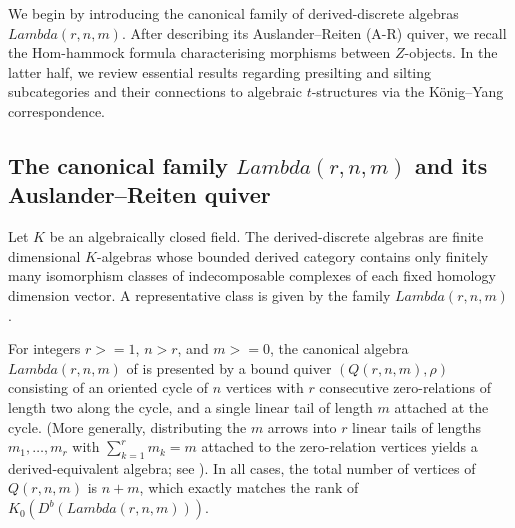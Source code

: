 \documentclass[11pt, a4paper]{article}
\theoremstyle{definition}
\def\Lambda{Lambda}%
\def\ge{>=}%
\def\mathcal#1{#1}%
\def\Db{D^b}%
\newcommand{\Db}{\mathcal{D}^b}
\begin{document}
We begin by introducing the canonical family of derived-discrete algebras $\Lambda(r,n,m)$. After describing its Auslander--Reiten (A-R) quiver, we recall the Hom-hammock formula characterising morphisms between $\mathcal{Z}$-objects. In the latter half, we review essential results regarding presilting and silting subcategories and their connections to algebraic $t$-structures via the K\"onig--Yang correspondence.

\subsection{The canonical family \texorpdfstring{$\Lambda(r,n,m)$}{Lambda(r,n,m)} and its Auslander--Reiten quiver}\label{subsec:prelim-AR}

Let $K$ be an algebraically closed field. The derived-discrete algebras are finite dimensional $K$-algebras whose bounded derived category contains only finitely many isomorphism classes of indecomposable complexes of each fixed homology dimension vector. A representative class is given by the family $\Lambda(r,n,m)$.

For integers $r \ge 1$, $n > r$, and $m \ge 0$, the canonical algebra $\Lambda(r,n,m)$ of \cite{BGS2004} is presented by a bound quiver $(Q(r,n,m), \rho)$ consisting of an oriented cycle of $n$ vertices with $r$ consecutive zero-relations of length two along the cycle, and a single linear tail of length $m$ attached at the cycle. (More generally, distributing the $m$ arrows into $r$ linear tails of lengths $m_1, \dots, m_r$ with $\sum_{k=1}^r m_k = m$ attached to the zero-relation vertices yields a derived-equivalent algebra; see ). In all cases, the total number of vertices of $Q(r,n,m)$ is $n+m$, which exactly matches the rank of $K_0(\Db(\Lambda(r,n,m)))$.
\end{document}

